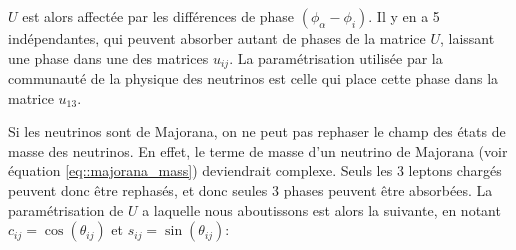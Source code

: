         $U$ est alors affectée par les différences de phase $(\phi_{\alpha}-\phi_i)$. Il y en a 5 indépendantes, qui peuvent absorber autant de phases de la matrice $U$, laissant une phase dans une des matrices $u_{ij}$. La paramétrisation utilisée par la communauté de la physique des neutrinos est celle qui place cette phase dans la matrice $u_{13}$.
        
        Si les neutrinos sont de Majorana, on ne peut pas rephaser le champ des états de masse des neutrinos. En effet, le terme de masse d'un neutrino de Majorana (voir équation \eqref{eq::majorana_mass}) deviendrait complexe. Seuls les 3 leptons chargés peuvent donc être rephasés, et donc seules 3 phases peuvent être absorbées. La paramétrisation de $U$ a laquelle nous aboutissons est alors la suivante, en notant $c_{ij}=\cos(\theta_{ij})$ et $s_{ij}=\sin(\theta_{ij})$: 
